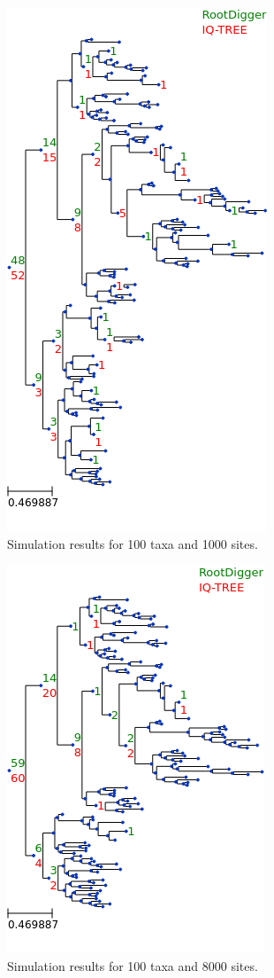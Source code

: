\documentclass{article}
\begin{document}
\begin{figure}
  \includegraphics{figs/sim_results/100_1000.png}
  \caption{Simulation results for 100 taxa and 1000
  sites. \label{fig:sim-results-100t-1000s}}
\end{figure}

\begin{figure}
  \includegraphics{figs/sim_results/100_8000.png}
  \caption{Simulation results for 100 taxa and 8000
  sites. \label{fig:sim-results-100t-8000s}}
\end{figure}
\end{document}
